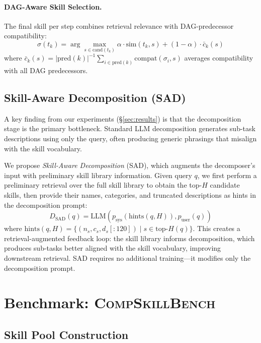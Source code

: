 \documentclass[11pt]{article}
\newcommand{\benchmark}{\textsc{CompSkillBench}}
\begin{document}
\paragraph{DAG-Aware Skill Selection.}
The final skill per step combines retrieval relevance with DAG-predecessor compatibility:
\begin{equation}
\sigma(t_k) = \arg\max_{s \in \text{cand}(t_k)} \alpha \!\cdot\! \text{sim}(t_k, s) + (1\!-\!\alpha) \!\cdot\! \bar{c}_k(s)
\end{equation}
where $\bar{c}_k(s) = |\text{pred}(k)|^{-1}\!\sum_{i \in \text{pred}(k)} \text{compat}(\sigma_i, s)$ averages compatibility with all DAG predecessors.

\subsection{Skill-Aware Decomposition (SAD)}
\label{sec:sad}

A key finding from our experiments (\S\ref{sec:results}) is that the decomposition stage is the primary bottleneck.
Standard LLM decomposition generates sub-task descriptions using only the query, often producing generic phrasings that misalign with the skill vocabulary.

We propose \emph{Skill-Aware Decomposition} (SAD), which augments the decomposer's input with preliminary skill library information.
Given query $q$, we first perform a preliminary retrieval over the full skill library to obtain the top-$H$ candidate skills, then provide their names, categories, and truncated descriptions as hints in the decomposition prompt:
\begin{equation}
D_{\text{SAD}}(q) = \text{LLM}(p_{\text{sys}}(\text{hints}(q, H)), p_{\text{user}}(q))
\label{eq:sad}
\end{equation}
where $\text{hints}(q, H) = \{(n_s, c_s, d_s[:120]) \mid s \in \text{top-}H(q)\}$.
This creates a retrieval-augmented feedback loop: the skill library informs decomposition, which produces sub-tasks better aligned with the skill vocabulary, improving downstream retrieval.
SAD requires no additional training---it modifies only the decomposition prompt.


\section{Benchmark: \benchmark{}}
\label{sec:benchmark}

\subsection{Skill Pool Construction}
\end{document}
